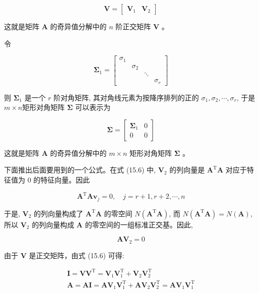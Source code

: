 \documentclass[10pt]{article}
\begin{document}
\[
\boldsymbol{V}=\left[\begin{array}{ll}
\boldsymbol{V}_{1} & \boldsymbol{V}_{2} \tag{15.6}
\end{array}\right]
\]

这就是矩阵 $\boldsymbol{A}$ 的奇异值分解中的 $n$ 阶正交矩阵 $\boldsymbol{V}$ 。

令

$$
\boldsymbol{\Sigma}_{1}=\left[\begin{array}{llll}
\sigma_{1} & & & \\
& \sigma_{2} & & \\
& & \ddots & \\
& & & \sigma_{r}
\end{array}\right]
$$

则 $\boldsymbol{\Sigma}_{1}$ 是一个 $r$ 阶对角矩阵, 其对角线元素为按降序排列的正的 $\sigma_{1}, \sigma_{2}, \cdots, \sigma_{r}$, 于是 $m \times n$矩形对角矩阵 $\boldsymbol{\Sigma}$ 可以表示为

\[
\boldsymbol{\Sigma}=\left[\begin{array}{cc}
\boldsymbol{\Sigma}_{1} & 0  \tag{15.7}\\
0 & 0
\end{array}\right]
\]

这就是矩阵 $\boldsymbol{A}$ 的奇异值分解中的 $m \times n$ 矩形对角矩阵 $\boldsymbol{\Sigma}$ 。

下面推出后面要用到的一个公式。在式 (15.6) 中, $\boldsymbol{V}_{2}$ 的列向量是 $\boldsymbol{A}^{\mathrm{T}} \boldsymbol{A}$ 对应于特征值为 0 的特征向量。因此


\begin{equation*}
\boldsymbol{A}^{\mathrm{T}} \boldsymbol{A} \boldsymbol{v}_{j}=0, \quad j=r+1, r+2, \cdots, n \tag{15.8}
\end{equation*}


于是, $\boldsymbol{V}_{2}$ 的列向量构成了 $\boldsymbol{A}^{\mathrm{T}} \boldsymbol{A}$ 的零空间 $N\left(\boldsymbol{A}^{\mathrm{T}} \boldsymbol{A}\right)$, 而 $N\left(\boldsymbol{A}^{\mathrm{T}} \boldsymbol{A}\right)=N(\boldsymbol{A})$, 所以 $\boldsymbol{V}_{2}$ 的列向量构成 $\boldsymbol{A}$ 的零空间的一组标准正交基。因此,


\begin{equation*}
\boldsymbol{A} \boldsymbol{V}_{2}=0 \tag{15.9}
\end{equation*}


由于 $\boldsymbol{V}$ 是正交矩阵，由式 (15.6) 可得:


\begin{gather*}
\boldsymbol{I}=\boldsymbol{V} \boldsymbol{V}^{\mathrm{T}}=\boldsymbol{V}_{1} \boldsymbol{V}_{1}^{\mathrm{T}}+\boldsymbol{V}_{2} \boldsymbol{V}_{2}^{\mathrm{T}}  \tag{15.10}\\
\boldsymbol{A}=\boldsymbol{A} \boldsymbol{I}=\boldsymbol{A} \boldsymbol{V}_{1} \boldsymbol{V}_{1}^{\mathrm{T}}+\boldsymbol{A} \boldsymbol{V}_{2} \boldsymbol{V}_{2}^{\mathrm{T}}=\boldsymbol{A} \boldsymbol{V}_{1} \boldsymbol{V}_{1}^{\mathrm{T}} \tag{15.11}
\end{gather*}
\end{document}
